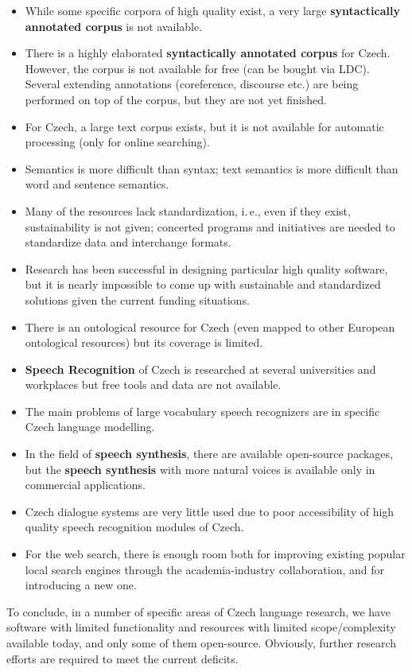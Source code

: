 \begin{multicols}{2}
\begin{itemize}
\item While some specific corpora of high quality exist, a very large \textbf{syntactically annotated corpus} is not available.
\item There is a highly elaborated \textbf{syntactically annotated corpus} for Czech. However, the corpus is not available for free (can be bought via LDC). Several extending annotations (coreference, discourse etc.) are being performed on top of the corpus, but they are not yet finished.
\item For Czech, a large text corpus exists, but it is not available for automatic processing (only for online searching).
\item Semantics is more difficult than syntax; text semantics is more difficult than word and sentence semantics.
\item Many of the resources lack standardization, i.\,e., even if they exist, sustainability is not given; concerted programs and initiatives are needed to standardize data and interchange formats.
\item Research has been successful in designing particular high quality software, but it is nearly impossible to come up with sustainable and standardized solutions given the current funding situations.
\item There is an ontological resource for Czech (even mapped to other European ontological resources) but its coverage is limited.
\item \textbf{Speech Recognition} of Czech is researched at several universities and workplaces but free tools and data are not available.
\item The main problems of large vocabulary speech recognizers are in specific Czech language modelling.
\item In the field of \textbf{speech synthesis}, there are available open-source packages, but the \textbf{speech synthesis} with more natural voices is available only in commercial applications.
\item Czech dialogue systems are very little used due to poor accessibility of high quality speech recognition modules of Czech.
\item For the web search, there is enough room both for improving existing popular local search engines through the academia-industry collaboration, and for introducing a new one.
\end{itemize}
To conclude, in a number of specific areas of Czech language research, we have software with limited functionality and resources with limited scope/complexity available today, and only some of them open-source. Obviously, further research efforts are required to meet the current deficits.


\end{multicols}
